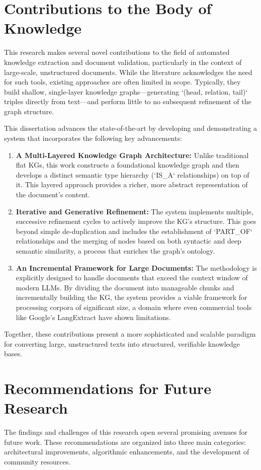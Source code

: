 \section{Contributions to the Body of Knowledge}
\label{sec:contributions}
This research makes several novel contributions to the field of automated knowledge extraction and document validation, particularly in the context of large-scale, unstructured documents. While the literature acknowledges the need for such tools, existing approaches are often limited in scope. Typically, they build shallow, single-layer knowledge graphs—generating `(head, relation, tail)` triples directly from text—and perform little to no subsequent refinement of the graph structure.

This dissertation advances the state-of-the-art by developing and demonstrating a system that incorporates the following key advancements:
\begin{enumerate}
    \item \textbf{A Multi-Layered Knowledge Graph Architecture:} Unlike traditional flat KGs, this work constructs a foundational knowledge graph and then develops a distinct semantic type hierarchy (`IS\_A` relationships) on top of it. This layered approach provides a richer, more abstract representation of the document's content.

    \item \textbf{Iterative and Generative Refinement:} The system implements multiple, successive refinement cycles to actively improve the KG's structure. This goes beyond simple de-duplication and includes the establishment of `PART\_OF` relationships and the merging of nodes based on both syntactic and deep semantic similarity, a process that enriches the graph's ontology.

    \item \textbf{An Incremental Framework for Large Documents:} The methodology is explicitly designed to handle documents that exceed the context window of modern LLMs. By dividing the document into manageable chunks and incrementally building the KG, the system provides a viable framework for processing corpora of significant size, a domain where even commercial tools like Google's LangExtract have shown limitations.
\end{enumerate}
Together, these contributions present a more sophisticated and scalable paradigm for converting large, unstructured texts into structured, verifiable knowledge bases.

\section{Recommendations for Future Research}
\label{sec:future_research}
The findings and challenges of this research open several promising avenues for future work. These recommendations are organized into three main categories: architectural improvements, algorithmic enhancements, and the development of community resources.

